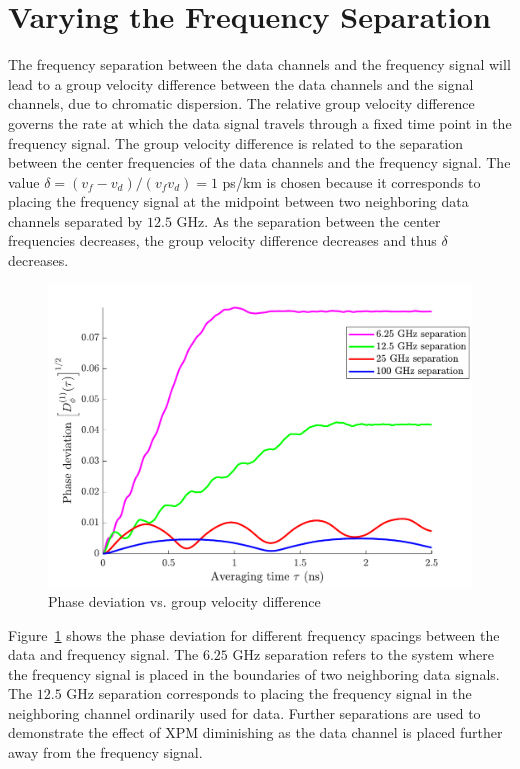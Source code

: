 \section{Varying the Frequency Separation}

The frequency separation between the data channels and the frequency signal will lead to a group velocity difference between the data channels and the signal channels, due to chromatic dispersion. The relative group velocity difference governs the rate at which the data signal travels through a fixed time point in the frequency signal. The group velocity difference is related to the separation between the center frequencies of the data channels and the frequency signal. The value $\delta = (v_{f}-v_{d})/(v_fv_d) = 1$ ps/km is chosen because it corresponds to placing the frequency signal at the midpoint between two neighboring data channels separated by $12.5$ GHz. As the separation between the center frequencies decreases, the group velocity difference decreases and thus $\delta$ decreases. 

\begin{figure}[htb]
	\centering
	\includegraphics[scale=0.9]{img/GVPhaseStability}
	\caption{Phase deviation vs. group velocity difference} \label{fig:GVPhaseStability}
\end{figure}
%
Figure~\ref{fig:GVPhaseStability} shows the phase deviation for different frequency spacings between the data and frequency signal. The $6.25$ GHz separation refers to the system where the frequency signal is placed in the boundaries of two neighboring data signals. The $12.5$ GHz separation corresponds to placing the frequency signal in the neighboring channel ordinarily used for data. Further separations are used to demonstrate the effect of XPM diminishing as the data channel is placed further away from the frequency signal.

